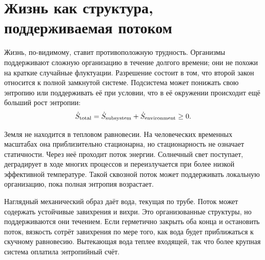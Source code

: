 \section{Жизнь как структура, поддерживаемая потоком}

Жизнь, по-видимому, ставит противоположную трудность. Организмы поддерживают сложную организацию в течение долгого времени; они не похожи на краткие случайные флуктуации. Разрешение состоит в том, что второй закон относится к полной замкнутой системе. Подсистема может понижать свою энтропию или поддерживать её при условии, что в её окружении происходит ещё больший рост энтропии:
\begin{equation}
 \dot S_{\rm total}
 =\dot S_{\rm subsystem}+\dot S_{\rm environment}\geq 0.
 \label{eq:sm8-open-system-second-law}
\end{equation}

Земля не находится в тепловом равновесии. На человеческих временных масштабах она приблизительно стационарна, но стационарность не означает статичности. Через неё проходит поток энергии. Солнечный свет поступает, деградирует в ходе многих процессов и переизлучается при более низкой эффективной температуре. Такой сквозной поток может поддерживать локальную организацию, пока полная энтропия возрастает.

Наглядный механический образ даёт вода, текущая по трубе. Поток может содержать устойчивые завихрения и вихри. Это организованные структуры, но поддерживаются они течением. Если герметично закрыть оба конца и остановить поток, вязкость сотрёт завихрения по мере того, как вода будет приближаться к скучному равновесию. Вытекающая вода теплее входящей, так что более крупная система оплатила энтропийный счёт.

\begin{classroomqa}
\end{classroomqa}

